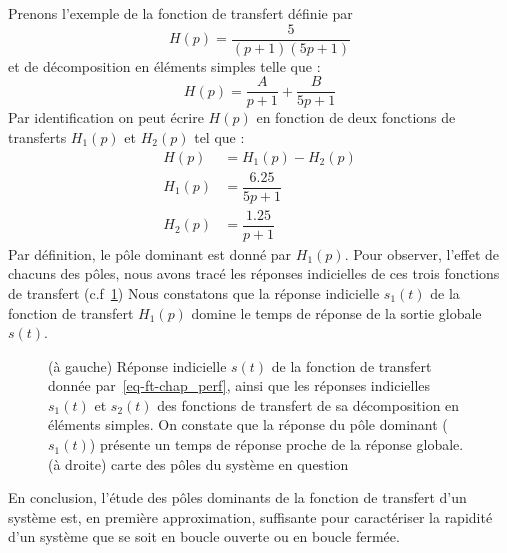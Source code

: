 Prenons l'exemple de la fonction de transfert définie par  
\begin{equation}
H(p)=\dfrac{5}{(p+1)(5p+1)}\label{eq-ft-chap_perf}
\end{equation}
et de décomposition en éléments simples telle que :
\[
H(p)=\dfrac{A}{p+1}+\dfrac{B}{5p+1}
\]
Par identification on peut écrire $H(p)$ en fonction de
deux fonctions de transferts $H_1(p)$ et $H_2(p)$ tel que :
\begin{align*}
	H(p)&=H_1(p)-H_2(p)\\
	H_1(p)&=\dfrac{6.25}{5p+1}\\
	H_2(p)&=\dfrac{1.25}{p+1}
\end{align*}
Par définition, le pôle dominant est donné par $H_1(p)$.
Pour observer, l'effet de chacuns des pôles, nous avons tracé 
les réponses indicielles de ces trois fonctions de transfert
(c.f~\cref{fig-poles_dominants})
Nous constatons que la réponse indicielle $s_1(t)$ de la fonction
de transfert $H_1(p)$ domine le temps de réponse de la sortie
globale $s(t)$.
\begin{figure}[!h]
    \centering
    
    \caption{(à gauche) Réponse indicielle $s(t)$ de la fonction de 
             transfert donnée par~\cref{eq-ft-chap_perf}, ainsi que les 
             réponses indicielles $s_1(t)$ et $s_2(t)$ des fonctions de 
             transfert de sa décomposition en éléments simples. 
             On constate que la réponse du pôle dominant ($s_1(t)$) 
             présente un temps de réponse proche de la réponse globale. 
             (à droite) carte des pôles du système en question
             \label{fig-poles_dominants}}
\end{figure}
En conclusion, l'étude des pôles dominants de la fonction de transfert 
d'un système est, en première approximation, suffisante pour caractériser 
la rapidité d'un système que se soit en boucle ouverte ou en boucle fermée.
